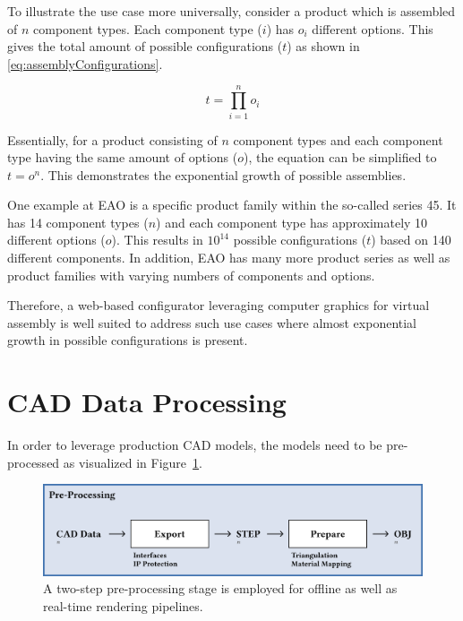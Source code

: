 To illustrate the use case more universally, consider a product which is assembled of $n$ component types. Each component type ($i$) has $o_i$ different options. This gives the total amount of possible configurations ($t$) as shown in \autoref{eq:assemblyConfigurations}.

\begin{equation}
  t = \prod_{i=1}^n o_i
  \label{eq:assemblyConfigurations}
\end{equation}

Essentially, for a product consisting of $n$ component types and each component type having the same amount of options ($o$), the equation can be simplified to $t = o^n$. This demonstrates the exponential growth of possible assemblies.

One example at EAO is a specific product family within the so-called series 45. It has 14 component types ($n$) and each component type has approximately 10 different options ($o$). This results in $10^{14}$ possible configurations ($t$) based on 140 different components. In addition, EAO has many more product series as well as product families with varying numbers of components and options.

Therefore, a web-based configurator leveraging computer graphics for virtual assembly is well suited to address such use cases where almost exponential growth in possible configurations is present.

\section{CAD Data Processing}

In order to leverage production \gls{CAD} models, the models need to be pre-processed as visualized in Figure~\ref{fig:cad-preprocessing}. 

\begin{figure}[H]
  \centering
  \includegraphics[width=0.9\columnwidth]{resources/cad-pipeline-preprocessing.png}
  \caption{A two-step pre-processing stage is employed for offline as well as real-time rendering pipelines.}
  \label{fig:cad-preprocessing}
\end{figure}

